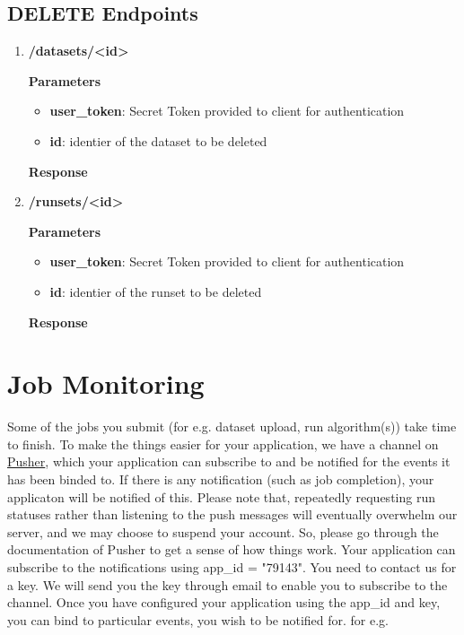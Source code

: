 \documentclass[a4paper,10pt]{scrartcl}
\begin{document}
\subsection{DELETE Endpoints}
\begin{enumerate}
\item \textbf{/datasets/<id>}
\textbf{Parameters}
\begin{itemize}
 \item \textbf{user\_token}: Secret Token provided to client for authentication
 \item \textbf{id}: identier of the dataset to be deleted 
\end{itemize}
\textbf{Response}
%
\item \textbf{/runsets/<id>}
\textbf{Parameters}
\begin{itemize}
  \item \textbf{user\_token}: Secret Token provided to client for authentication
 \item \textbf{id}: identier of the runset to be deleted 
\end{itemize}
\textbf{Response}
\end{enumerate}

\section{Job Monitoring}
Some of the jobs you submit (for e.g. dataset upload, run algorithm(s)) take time to finish. 
To make the things easier for your application, we have a channel on \href{https://pusher.com/}{Pusher},
which your application can subscribe to and be notified for the events it has been binded to. If there is any notification 
(such as job completion), your applicaton will be notified of this. Please note that, repeatedly requesting
run statuses rather than listening to the push messages will eventually overwhelm our server, and we may choose
to suspend your account. So, please go through the documentation of Pusher to get a sense of how things work. Your 
application can subscribe to the notifications using app\_id = "79143". You need to contact us for a key. We will send 
you the key through email to enable you to subscribe to the channel. Once you have configured your application using the 
app\_id and key, you can bind to particular events, you wish to be notified for. for e.g. 
\end{document}
